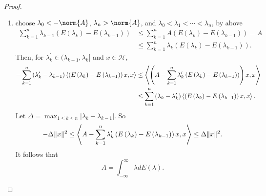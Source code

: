 \documentclass[a4paper,12pt]{article}
\begin{document}
\begin{proof}
\begin{enumerate}[label=(\arabic{*})]
        \item choose $\lambda_0 < -\norm{A}$, $\lambda_n > \norm{A}$, and $\lambda_0 < \lambda_1 < \cdots < \lambda_n$, by above
        \begin{equation*}
            \begin{aligned}
                \sum_{k=1}^n \lambda_{k-1}\left(E\left(\lambda_k\right)-E\left(\lambda_{k-1}\right)\right) &\leq \sum_{k=1}^n A\left(E\left(\lambda_k\right)-E\left(\lambda_{k-1}\right)\right)=A  \\ 
                &\leq \sum_{k=1}^n \lambda_k\left(E\left(\lambda_k\right)-E\left(\lambda_{k-1}\right)\right).
            \end{aligned}
        \end{equation*}
        Then, for $\lambda_k^\prime \in (\lambda_{k-1},\lambda_k]$ and $x \in \mathcal{H}$,
        \begin{equation*}
            \begin{aligned}
                -\sum_{k=1}^n\left(\lambda_k^{\prime}-\lambda_{k-1}\right) \left\langle \left(E\left(\lambda_k\right)-E\left(\lambda_{k-1}\right)\right) x, x \right\rangle & \leq \left\langle \left(A-\sum_{k=1}^n \lambda_k^{\prime}\left(E\left(\lambda_k\right)-E\left(\lambda_{k-1}\right)\right)\right) x, x \right\rangle \\
                & \leq \sum_{k=1}^n\left(\lambda_k-\lambda_k^{\prime}\right) \left\langle \left(E\left(\lambda_k\right)-E\left(\lambda_{k-1}\right)\right) x, x \right\rangle.
            \end{aligned}
        \end{equation*}
        Let $\Delta=\max _{1 \leq k \leq n}\left|\lambda_k-\lambda_{k-1}\right|$. So
        \begin{equation*}
            -\Delta\|x\|^2 \leq \left\langle A-\sum_{k=1}^n \lambda_k^{\prime}\left(E\left(\lambda_k\right)-E\left(\lambda_{k-1}\right)\right) x, x \right\rangle \leq \Delta\|x\|^2.
        \end{equation*}
        It follows that
        \begin{equation*}
            A=\int_{-\infty}^{\infty} \lambda d E(\lambda).
        \end{equation*}


\end{enumerate}
\end{proof}
\end{document}
